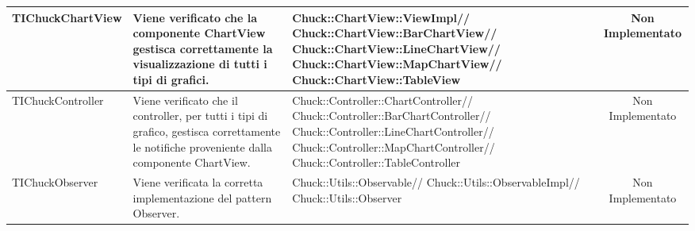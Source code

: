 \begin{table}[H]
\begin{center}
\begin{tabu}{| l | l | l | c |}
	TIChuckChartView
				&
Viene verificato che la componente ChartView gestisca correttamente la visualizzazione di tutti i tipi di grafici.
			& \parbox[t]{0.4\textwidth}{
Chuck::ChartView::ViewImpl//
Chuck::ChartView::BarChartView//
Chuck::ChartView::LineChartView//
Chuck::ChartView::MapChartView//
Chuck::ChartView::TableView}
			& Non Implementato
			\\ \hline



	TIChuckController
				&
Viene verificato che il controller, per tutti i tipi di grafico, gestisca correttamente le notifiche proveniente dalla componente ChartView.
			& \parbox[t]{0.4\textwidth}{
Chuck::Controller::ChartController//
Chuck::Controller::BarChartController//
Chuck::Controller::LineChartController//
Chuck::Controller::MapChartController//
Chuck::Controller::TableController}
			& Non Implementato
			\\ \hline



	TIChuckObserver &
Viene verificata la corretta implementazione del pattern Observer.
			& \parbox[t]{0.4\textwidth}{
Chuck::Utils::Observable//
Chuck::Utils::ObservableImpl//
Chuck::Utils::Observer}
			& Non Implementato
			\\ \hline











\end{tabu}
\end{center}
\end{table}
